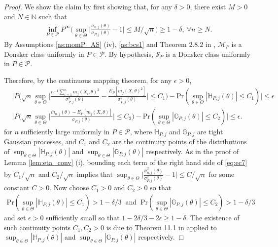\documentclass[letterpaper,11pt]{article}
\theoremstyle{myplain}
\theoremstyle{mydefinition}
\theoremstyle{myremark}
\renewcommand{\cite}{\citet}
\newcommand{\dsM}{\mathcal{M}}
\numberwithin{equation}{section}
\numberwithin{figure}{section}
\begin{document}
\begin{appendices}
\begin{proof}
We show the claim by first showing that, for any $\delta>0$, there exist $M>0$ and $N\in\mathbb N$ such that
\begin{align}
\inf_{P\in\mathcal P}P^\infty\Big(\sup_{\theta\in\Theta}\Big|\frac{\hat\sigma_{n,j}(\theta)}{\sigma_{P,j}(\theta)}-1\Big|\le M/\sqrt n\Big)\ge 1-\delta,~\forall n\ge N.\label{eq:ec10}
\end{align}
By Assumptions  \ref{as:momP_AS} (iv), \ref{as:bcs1} and Theorem 2.8.2 in \cite{Vaart_Wellner2000aBK},  $\dsM_P$ is a  Donsker class uniformly in $P\in\mathcal P$. 
By hypothesis, $\mathcal S_P$ is a  Donsker class uniformly in $P\in\mathcal P$. 

 Therefore, by the continuous mapping theorem, for any $\epsilon>0$, 
\begin{align}
&\Big|P\Big(	\sqrt n\sup_{\theta\in\Theta}\Big|\frac{n^{-1}\sum_{i=1}^n m_{j}(X_i,\theta)^2}{\sigma_{P,j}^2(\theta)}-\frac{E_P[m_j(X,\theta)^2]}{\sigma_{P,j}^2(\theta)}\Big|\le C_1\Big)-\text{Pr}(\sup_{\theta\in\Theta}|\mathbb H_{P,j}(\theta)|\le C_1)\Big|\le \epsilon \label{eq:ec11}\\	
&\Big|P\Big(\sqrt n\sup_{\theta\in\Theta}\Big|\frac{\bar m_{n,j}(\theta)-E_P[m_j(X,\theta)]}{\sigma_{P,j}(\theta)}\Big|\le C_2\Big)-\text{Pr}(\sup_{\theta\in\Theta}|\mathbb G_{P,j}(\theta)|\le C_2)\Big|\le \epsilon .\label{eq:ec12}
\end{align}
for $n$ sufficiently large uniformly in $P\in\mathcal P$, where $\mathbb H_{P,j}$ and $\mathbb G_{P,j}$ are tight Gaussian processes, and $C_1$ and $C_2$ are the continuity points of the distributions of $\sup_{\theta\in\Theta}|\mathbb H_{P,j}(\theta)|$ and $\sup_{\theta\in\Theta}|\mathbb G_{P,j}(\theta)|$ respectively.  As in the proof of Lemma \ref{lem:eta_conv} (i), bounding each term of the right hand side of \eqref{eq:ec7} by $C_1/\sqrt n$ and $C_2/\sqrt n$ implies that  $\sup_{\theta\in\Theta}\Big|\frac{\hat\sigma_{n,j}^2(\theta)}{\sigma_{P,j}^2(\theta)}-1\Big|\le C/\sqrt n$ for some constant $C>0$.  Now choose $C_1>0$ and $C_2>0$ so that
\begin{align}
	\text{Pr}(\sup_{\theta\in\Theta}|\mathbb H_{P,j}(\theta)|\le C_1)> 1-\delta/3~\text{ and }~
	\text{Pr}(\sup_{\theta\in\Theta}|\mathbb G_{P,j}(\theta)|\le C_2)>1-\delta/3\label{eq:ec13}
\end{align}
and set $\epsilon>0$ sufficiently small so that $1-2\delta/3-2\epsilon\ge 1-\delta$. The existence of such continuity points $C_1,C_2>0$   is due to Theorem 11.1 in \cite{Davydov:aa} applied to $\sup_{\theta\in\Theta}|\mathbb H_{P,j}(\theta)|$ and $\sup_{\theta\in\Theta}|\mathbb G_{P,j}(\theta)|$ respectively.

\end{proof}
\end{appendices}
\end{document}
